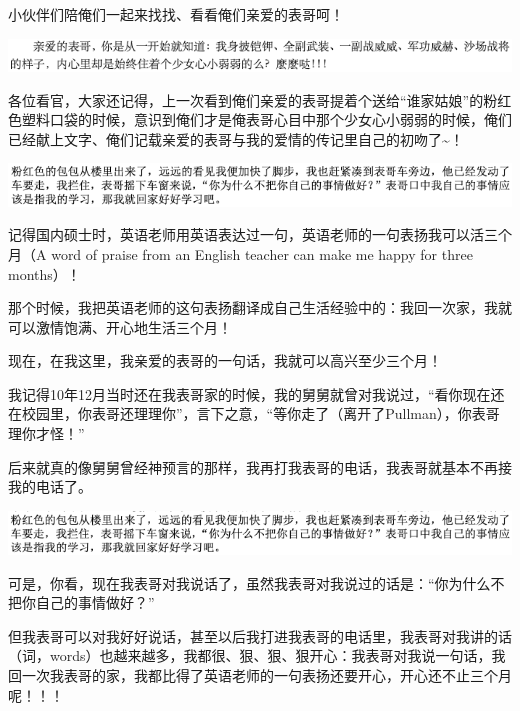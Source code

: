 \documentclass[9pt, b5paper]{article}
\begin{document}
小伙伴们陪俺们一起来找找、看看俺们亲爱的表哥呵！

\begin{center}
\includegraphics[width=.9\linewidth]{./pic/backups_plans_20210502_092347.png}
\end{center}

各位看官，大家还记得，上一次看到俺们亲爱的表哥提着个送给“谁家姑娘”的粉红色塑料口袋的时候，意识到俺们才是俺表哥心目中那个少女心小弱弱的时候，俺们已经献上文字、俺们记载亲爱的表哥与我的爱情的传记里自己的初吻了\textasciitilde{}！ 

\begin{center}
\includegraphics[width=.9\linewidth]{./pic/backups_plans_20210502_092505.png}
\end{center}

记得国内硕士时，英语老师用英语表达过一句，英语老师的一句表扬我可以活三个月（A word of praise from an English teacher can make me happy for three months）！

那个时候，我把英语老师的这句表扬翻译成自己生活经验中的：我回一次家，我就可以激情饱满、开心地生活三个月！

现在，在我这里，我亲爱的表哥的一句话，我就可以高兴至少三个月！

我记得10年12月当时还在我表哥家的时候，我的舅舅就曾对我说过，“看你现在还在校园里，你表哥还理理你”，言下之意，“等你走了（离开了Pullman），你表哥理你才怪！”

后来就真的像舅舅曾经神预言的那样，我再打我表哥的电话，我表哥就基本不再接我的电话了。

\begin{center}
\includegraphics[width=.9\linewidth]{./pic/backups_plans_20210502_174020.png}
\end{center}

可是，你看，现在我表哥对我说话了，虽然我表哥对我说过的话是：“你为什么不把你自己的事情做好？”

但我表哥可以对我好好说话，甚至以后我打进我表哥的电话里，我表哥对我讲的话（词，words）也越来越多，我都很、狠、狠、狠开心：我表哥对我说一句话，我回一次我表哥的家，我都比得了英语老师的一句表扬还要开心，开心还不止三个月呢！！！
\end{document}
